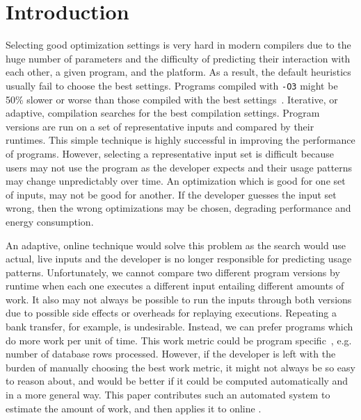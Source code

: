 \section{Introduction}

    Selecting good optimization settings is very hard in modern compilers due to the huge number of parameters and the difficulty of
    predicting their interaction with each other, a given program, and the platform. As a result, the default heuristics usually fail to
    choose the best settings. Programs compiled with \texttt{-O3} might be 50\% slower or worse than those compiled with the best
    settings~\cite{fursin07,chen12b}. Iterative, or adaptive, compilation searches for the best compilation settings. Program versions are
    run on a set of representative inputs and compared by their runtimes. This simple technique is highly successful in improving the
    performance of programs. However, selecting a representative input set is difficult because users may not use the program as the
    developer expects and their usage patterns may change unpredictably over time. An optimization which is good for one set of inputs, may
    not be good for another. If the developer guesses the input set wrong, then the wrong optimizations may be chosen, degrading
    performance and energy consumption.

    An adaptive, online technique would solve this problem as the search would use actual, live inputs and the developer is no longer
    responsible for predicting usage patterns. Unfortunately, we cannot compare two different program versions by runtime when each one
    executes a different input entailing different amounts of work. It also may not always be possible to run the inputs through both
    versions due to possible side effects or overheads for replaying executions. Repeating a bank transfer, for example, is undesirable.
    Instead, we can prefer programs which do more work per unit of time. This work metric could be program
    specific~\cite{alameldeen06,coppa14}, e.g. number of database rows processed. However, if the developer is left with the burden of
    manually choosing the best work metric, it might not always be so easy to reason about, and would be better if it could be computed
    automatically and in a more general way. This paper contributes such an automated system to estimate the amount of work, and then
    applies it to online {\itercomp}.

